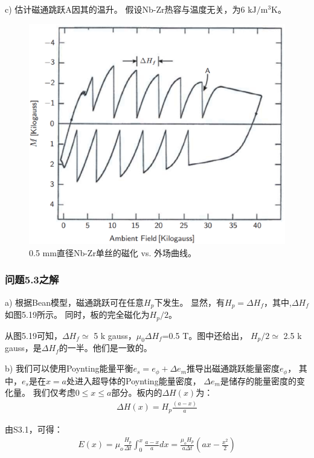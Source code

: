 c) 估计磁通跳跃A因其的温升。
假设Nb-Zr热容与温度无关，为6 $\mathrm{kJ/m^3 K}$。

\begin{figure}[htbp]
	\centering
	\includegraphics[scale=0.5]{chpt5/figs/fig5.19.eps}
	\caption{0.5 mm直径Nb-Zr单丝的磁化 vs. 外场曲线。}
\end{figure}


\subsubsection{问题5.3之解}
a) 根据Bean模型，磁通跳跃可在任意$H_p$下发生。
显然，有$H_p = \Delta H_f$，其中,$\Delta H_f$如图5.19所示。
同时，板的完全磁化为$H_p/2$。

从图5.19可知，$\Delta H_f\simeq$ 5 k gauss，$\mu_{0}\Delta H_f$=0.5 T。图中还给出，
$H_p/2\simeq$ 2.5 k gauss，是$\Delta H_f$的一半。他们是一致的。

b) 我们可以使用Poynting能量平衡$e_s=e_{\phi}+\Delta e_m$推导出磁通跳跃能量密度$e_{\phi}$，
其中，$e_s$是在$x=a$处进入超导体的Poynting能量密度， $\Delta e_m$是储存的能量密度的变化量。
我们仅考虑$0\le x\le a$部分。板内的$\Delta H(x)$为：
\begin{align*}%
\Delta H(x)=H_{p}\frac{(a-x)}{a}\tag{S3.1}
\end{align*}

由S3.1，可得：
\begin{align*}%
E(x)=\mu_{o}\frac{H_{p}}{\Delta t}\int_{0}^{x}\frac{a-x}{a}dx=\frac{\mu_{o}H_{p}}{a\Delta t}(ax-\frac{x^{2}}{2})\tag{S3.2}
\end{align*}

